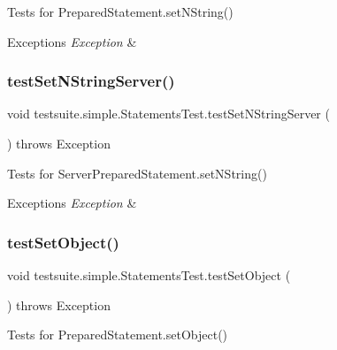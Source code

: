 Tests for Prepared\+Statement.\+set\+N\+String()


\begin{DoxyExceptions}{Exceptions}
{\em Exception} & \\
\hline
\end{DoxyExceptions}
\mbox{\label{classtestsuite_1_1simple_1_1_statements_test_abec2b7d40eb32e7b87af7c38836b9917}} 
\subsubsection{\texorpdfstring{test\+Set\+N\+String\+Server()}{testSetNStringServer()}}
{\footnotesize\ttfamily void testsuite.\+simple.\+Statements\+Test.\+test\+Set\+N\+String\+Server (\begin{DoxyParamCaption}{ }\end{DoxyParamCaption}) throws Exception}

Tests for Server\+Prepared\+Statement.\+set\+N\+String()


\begin{DoxyExceptions}{Exceptions}
{\em Exception} & \\
\hline
\end{DoxyExceptions}
\mbox{\label{classtestsuite_1_1simple_1_1_statements_test_acf80cede1ff53fcdebca2de611a1c015}} 
\subsubsection{\texorpdfstring{test\+Set\+Object()}{testSetObject()}}
{\footnotesize\ttfamily void testsuite.\+simple.\+Statements\+Test.\+test\+Set\+Object (\begin{DoxyParamCaption}{ }\end{DoxyParamCaption}) throws Exception}

Tests for Prepared\+Statement.\+set\+Object()


